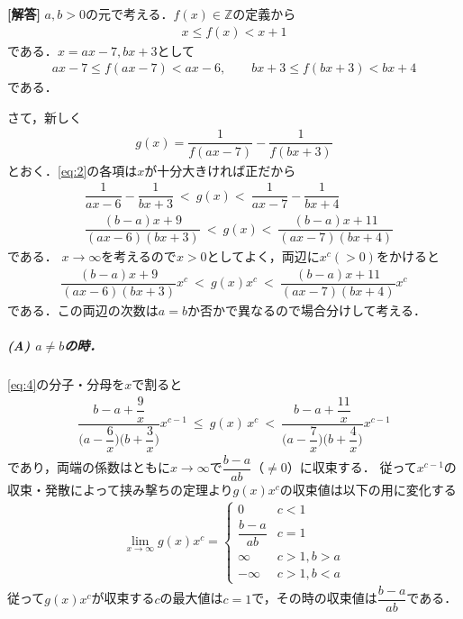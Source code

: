 \documentclass[../../main.tex]{subfiles}
\begin{document}
\begin{oframed}
  
\end{oframed}

{\bf [解答]}
$a,b>0$の元で考える．$f(x)\in\mathbb Z$の定義から
\begin{align}
  x\le f(x)<x+1 \label{eq:1}
\end{align}
である．$x=ax-7,bx+3$として
\begin{align}
  ax-7\le f(ax-7)<ax-6,\qquad bx+3\le f(bx+3)<bx+4 \label{eq:2}
\end{align}
である．

さて，新しく
\begin{align}
  g(x) = \dfrac{1}{f(ax-7)} - \dfrac{1}{f(bx+3)} \label{eq:3}
\end{align}
とおく．\cref{eq:2}の各項は$x$が十分大きければ正だから
\begin{align}
  & \dfrac{1}{ax-6}-\dfrac{1}{bx+3}\ <\ g(x) <\ \dfrac{1}{ax-7}-\dfrac{1}{bx+4} \\
  & \dfrac{(b-a)x+9}{(ax-6)(bx+3)}\  <\ g(x) <\ \dfrac{(b-a)x+11}{(ax-7)(bx+4)}
\end{align}
である．
$x\to\infty$を考えるので$x>0$としてよく，両辺に$x^c (>0)$をかけると
\begin{align}
  \dfrac{(b-a)x+9}{(ax-6)(bx+3)}x^c\ <\ g(x)x^c\ <\ \dfrac{(b-a)x+11}{(ax-7)(bx+4)}x^c \label{eq:4}
\end{align}
である．この両辺の次数は$a=b$か否かで異なるので場合分けして考える．

\subparagraph{(A) $a\neq b$の時．}

\cref{eq:4}の分子・分母を$x$で割ると
\begin{align}
  \dfrac{b-a+\dfrac{9}{x}}{\bigl(a-\dfrac{6}{x}\bigr)\bigl(b+\dfrac{3}{x}\bigr)}x^{c-1}\ \le\ g(x)\,x^{c}\ <\ \dfrac{b-a+\dfrac{11}{x}}{\bigl(a-\dfrac{7}{x}\bigr)\bigl(b+\dfrac{4}{x}\bigr)}x^{c-1}
\end{align}
であり，両端の係数はともに$x\to\infty$で$\dfrac{b-a}{ab}$（$\neq 0$）に収束する．
従って$x^{c-1}$の収束・発散によって挟み撃ちの定理より$g(x)x^{c}$の収束値は以下の用に変化する
\begin{align}
  \lim_{x\to\infty}g(x)x^{c} =
  \begin{cases}
    0 & c<1 \\
    \dfrac{b-a}{ab} & c=1 \\
    \infty  & c > 1, b>a \\
    -\infty & c > 1, b<a
  \end{cases}
\end{align}
従って$g(x)x^{c}$が収束する$c$の最大値は$c=1$で，その時の収束値は$\dfrac{b-a}{ab}$である．
\end{document}
